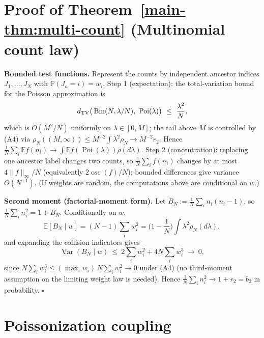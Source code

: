 \section{Proof of Theorem~\ref{main-thm:multi-count} (Multinomial count law)}\label{sec:S4}

\textbf{Bounded test functions.} Represent the counts by independent ancestor indices $J_1,\dots,J_N$ with $\mathbb P(J_a=i)=w_i$. Step 1 (expectation): the total-variation bound for the Poisson approximation is
\[
d_{\rm TV}\big(\operatorname{Bin}(N,\lambda/N),\ \operatorname{Poi}(\lambda)\big)\ \le\ \frac{\lambda^2}{N},
\]
which is $O(M^2/N)$ uniformly on $\lambda\in[0,M]$; the tail above $M$ is controlled by (A4) via $\rho_N((M,\infty))\le M^{-2}\int\lambda^2\rho_N\to M^{-2}r_2$. Hence $\frac1N\sum_i\mathbb E f(n_i)\to\int\mathbb E f(\operatorname{Poi}(\lambda))\rho(d\lambda)$. Step 2 (concentration): replacing one ancestor label changes two counts, so $\frac1N\sum_if(n_i)$ changes by at most $4\|f\|_\infty/N$ (equivalently $2\operatorname{osc}(f)/N$); bounded differences give variance $O(N^{-1})$. (If weights are random, the computations above are conditional on $w$.)

\textbf{Second moment (factorial-moment form).} Let $B_N:=\frac1N\sum_in_i(n_i-1)$, so $\frac1N\sum_in_i^2=1+B_N$. Conditionally on $w$,
\[
\mathbb E[B_N\mid w]=(N-1)\sum_iw_i^2=\Big(1-\frac1N\Big)\int\lambda^2\rho_N(d\lambda),
\]
and expanding the collision indicators gives
\[
\operatorname{Var}(B_N\mid w)\ \le\ 2\sum_iw_i^2+4N\sum_iw_i^3\ \longrightarrow\ 0,
\]
since $N\sum_iw_i^3\le(\max_iw_i)\,N\sum_iw_i^2\to0$ under (A4) (no third-moment assumption on the limiting weight law is needed). Hence $\frac1N\sum_in_i^2\to1+r_2=b_2$ in probability. $\square$

\section{Poissonization coupling}\label{sec:S5}

